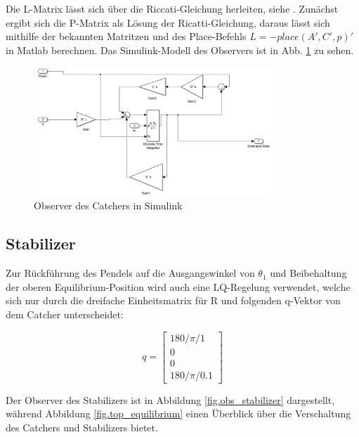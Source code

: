 Die L-Matrix lässt sich über die Riccati-Gleichung herleiten, siehe \citep{Werner.2013}. Zunächst ergibt sich die P-Matrix als Lösung der Ricatti-Gleichung, daraus lässt sich mithilfe der bekannten Matritzen und des Place-Befehls $L=-place(A',C',p)'$ in Matlab berechnen.
Das Simulink-Modell des Observers ist in Abb. \ref{fig.obs_catcher} zu sehen.

\begin{figure}[htbp]
	\centering	
	\includegraphics[width=0.8\textwidth]{Grafiken/simulink_observer_catcher.png}
	\caption{Observer des Catchers in Simulink}
	\label{fig.obs_catcher}
\end{figure}

\subsection{Stabilizer}
\label{stabilizer} 

Zur Rückführung des Pendels auf die Ausgangswinkel von $\theta_1$ und Beibehaltung der oberen Equilibrium-Position wird auch eine LQ-Regelung verwendet, welche sich nur durch die dreifache Einheitsmatrix für R und folgenden q-Vektor von dem Catcher unterscheidet:

\begin{equation}
q =\begin{bmatrix}
         180/\pi/1 \\
         0\\
         0\\
         180/\pi/0.1
        \end{bmatrix}
\end{equation}

Der Observer des Stabilizers ist in Abbildung \ref{fig.obs_stabilizer} dargestellt, während Abbildung \ref{fig.top_equilibrium} einen Überblick über die Verschaltung des Catchers und Stabilizers bietet.


